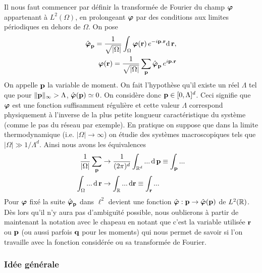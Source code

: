 \documentclass[10.5pt]{article}
\begin{document}
\begin{multicols*}{2}
Il nous faut commencer par définir la transformée de Fourier du champ $\boldsymbol{ \varphi}$ appartenant à $L^2(\Omega)$, en prolongeant $\boldsymbol{ \varphi}$ par des conditions aux limites périodiques en dehors de $\Omega$. On pose 
\begin{equation}
\begin{split}
\hat{\boldsymbol{ \varphi}}_{\bf p} = \frac{1}{\sqrt{|\Omega|}}\int_\Omega \boldsymbol{ \varphi}({\bf r}) \, e^{-i {\bf p} . {\bf r}} \text{d} \, {\bf r}, \\
\boldsymbol{ \varphi}({\bf r}) = \frac{1}{\sqrt{|\Omega|}}\sum_{\bf p} \hat{\boldsymbol{ \varphi}}_{\bf p} \, e^{i {\bf p}  .{\bf r}}
\end{split} 	
\end{equation}
On appelle ${\bf p}$ la variable de moment. On fait l'hypothèse qu'il existe un réel $\Lambda$ tel que pour $\|{\bf p}\|_{\infty} > \Lambda$, $\hat{\boldsymbol{ \varphi}}({\bf p}) \simeq 0$. On considère donc ${\bf p} \in [0, \Lambda]^d$. Ceci signifie que $\boldsymbol{ \varphi}$ est une fonction suffisamment régulière et cette valeur $\Lambda$ correspond physiquement à l'inverse de la plus petite longueur caractéristique du système (comme le pas du réseau par exemple). En pratique on suppose que dans la limite thermodynamique (i.e. $|\Omega| \to \infty$) on étudie des systèmes macroscopiques tels que $|\Omega|\gg 1/\Lambda^d$. Ainsi nous avons les équivalences 
\begin{equation}
\begin{split}
	\frac{1}{|\Omega|} \sum_{{\bf p}} & \rightarrow \frac{1}{(2\pi)^d} \int_{\mathbb{R}^d} ... \, \text{d} \, {\bf p}  \equiv \int_{\bf p} ... \\
	\int_\Omega	... \, \text{d} \, {\bf r} & \rightarrow \int_{\mathbb{R}} ... \, \text{d} {\bf r} \equiv \int_{\bf r} ...
\end{split}
\end{equation}
Pour $\boldsymbol{ \varphi}$ fixé la suite $\hat{\boldsymbol{ \varphi}}_{\bf p}$ dans $\ell^2$ devient une fonction $\hat{\boldsymbol{ \varphi}} : {\bf p} \rightarrow \hat{\boldsymbol{ \varphi}}({\bf p})$ de $L^2(\mathbb{R})$. 
Dès lors qu'il n'y aura pas d'ambiguïté possible, nous oublierons à partir de maintenant la notation avec le chapeau en notant que c'est la variable utilisée ${\bf r}$ ou ${\bf p}$ (ou aussi parfois ${\bf q}$ pour les moments) qui nous permet de savoir si l'on travaille avec la fonction considérée ou sa transformée de Fourier. \\


\subsubsection{Idée générale}

\label{sec:RG}


\end{multicols*}
\end{document}
